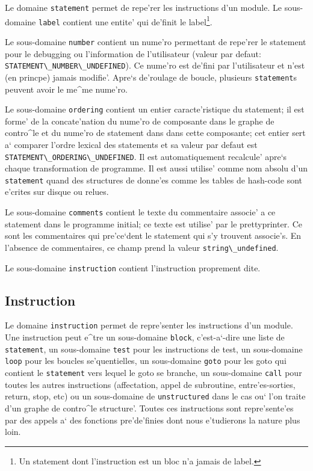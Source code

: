 { 
Le
domaine \verb/statement/ permet de repe'rer les instructions d'un
module.  Le sous-domaine \verb/label/ contient une entite' qui de'finit
le label\footnote{Un statement dont l'instruction est un bloc n'a
jamais de label.}.

Le sous-domaine \verb/number/ contient un nume'ro permettant
de repe'rer le statement pour le debugging ou l'information de
l'utilisateur (valeur par defaut:
\verb+STATEMENT\_NUMBER\_UNDEFINED+). Ce nume'ro est de'fini par
l'utilisateur et n'est (en princpe) jamais modifie'. Apre`s de'roulage
de boucle, plusieurs \verb/statement/s peuvent avoir le me^me nume'ro.

Le sous-domaine \verb/ordering/ contient un entier caracte'ristique du
statement; il est forme' de la concate'nation du nume'ro de composante
dans le graphe de contro^le et du nume'ro de statement dans dans cette
composante; cet entier sert a` comparer l'ordre lexical des statements
et sa valeur par defaut est \verb+STATEMENT\_ORDERING\_UNDEFINED+. Il
est automatiquement recalcule' apre`s chaque transformation de
programme. Il est aussi utilise' comme nom absolu d'un \verb/statement/
quand des structures de donne'es comme les tables de hash-code sont
e'crites sur disque ou relues.

Le sous-domaine {\tt comments} contient le texte du commentaire associe'
a ce statement dans le programme initial; ce texte est utilise' par le
prettyprinter. Ce sont les commentaires qui pre'ce`dent le statement
qui s'y trouvent associe's. En l'absence de commentaires, ce champ
prend la valeur \verb/string\_undefined/.

Le sous-domaine \verb/instruction/ contient
l'instruction proprement dite.
}

\subsection{Instruction}
\label{subsection-instruction}

{ 
Le domaine \verb/instruction/ permet de repre'senter les instructions
d'un module. Une instruction peut e^tre un sous-domaine \verb/block/,
c'est-a`-dire une liste de \verb/statement/, un sous-domaine \verb/test/
pour les instructions de test, un sous-domaine \verb/loop/ pour les
boucles se'quentielles, un sous-domaine \verb/goto/ pour les goto qui
contient le
\verb/statement/ vers lequel le goto se branche, un sous-domaine
\verb/call/ pour toutes les autres instructions (affectation, appel de
subroutine, entre'es-sorties, return, stop, etc) ou un sous-domaine de
\verb/unstructured/ dans le cas ou` l'on traite d'un graphe de contro^le
structure'. Toutes ces instructions 
sont repre'sente'es par des appels a` des fonctions pre'de'finies dont
nous e'tudierons la nature plus loin.
}

